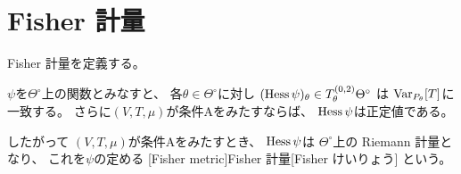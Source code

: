 \documentclass[report]{jlreq}
\begin{document}
\section{Fisher 計量}

Fisher 計量を定義する。

\begin{propdef}[Fisher 計量]
    $\psi$を$\Theta^\circ$上の\smooth 関数とみなすと、
    各$\theta \in \Theta^\circ$に対し
    $(\operatorname{Hess} \psi)_\theta
        \in T^{(0, 2)}_\theta \Theta^\circ$
    は
    $\operatorname{Var}_{P_\theta}[T]$に一致する。
    さらに$(V, T, \mu)$が条件Aをみたすならば、
    $\operatorname{Hess} \psi$は正定値である。

    したがって
    $(V, T, \mu)$が条件Aをみたすとき、
    $\operatorname{Hess}\psi$は
    $\Theta^\circ$上の Riemann 計量となり、
    これを$\psi$の定める
    [Fisher metric]{Fisher 計量}[Fisher けいりょう]
    という。
\end{propdef}
\end{document}

